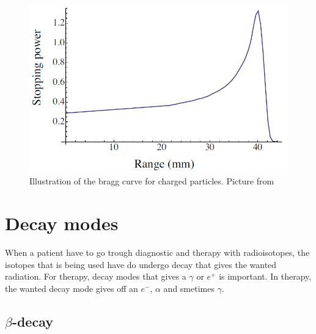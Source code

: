 \documentclass[twoside,english]{uiofysmaster/uiofysmaster}
\begin{document}
\begin{figure}[h!]
    \centering
    \includegraphics[scale=.25]{bragg.png}
    \caption{Illustration of the bragg curve for charged particles. Picture from \cite{inbook}}
    \label{fig:braggcurve}
\end{figure}


 
\section{Decay modes}
\label{sec:decaymodes}

When a patient have to go trough diagnostic and therapy with radioisotopes, the isotopes that is being used have do undergo decay that gives the wanted radiation. For therapy, decay modes  that gives a $\gamma$ or $e^{+}$ is important. In therapy, the wanted decay mode gives off an $e^{-}$, $\alpha$ and smetimes $\gamma$.

\subsection{$\beta$-decay}
\end{document}
